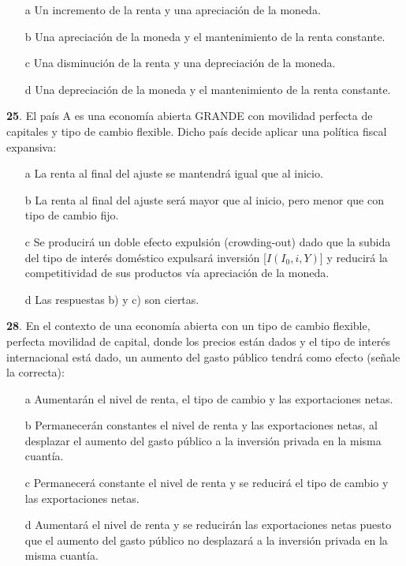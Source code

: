 \documentclass{nuevotema}
\begin{document}
\begin{enumerate}
	\item[a] Un incremento de la renta y una apreciación de la moneda.
	\item[b] Una apreciación de la moneda y el mantenimiento de la renta constante.
	\item[c] Una disminución de la renta y una depreciación de la moneda.
	\item[d] Una depreciación de la moneda y el mantenimiento de la renta constante.
\end{enumerate}

\textbf{25}. El país A es una economía abierta GRANDE con movilidad perfecta de capitales y tipo de cambio flexible. Dicho país decide aplicar una política fiscal expansiva:
\begin{enumerate}
	\item[a] La renta al final del ajuste se mantendrá igual que al inicio.
	\item[b] La renta al final del ajuste será mayor que al inicio, pero menor que con tipo de cambio fijo.
	\item[c] Se producirá un doble efecto expulsión (crowding-out) dado que la subida del tipo de interés doméstico expulsará inversión [$I(I_0, i, Y)$] y reducirá la competitividad de sus productos vía apreciación de la moneda.
	\item[d] Las respuestas b) y c) son ciertas.
\end{enumerate}


\textbf{28}. En el contexto de una economía abierta con un tipo de cambio flexible, perfecta movilidad de capital, donde los precios están dados y el tipo de interés internacional está dado, un aumento del gasto público tendrá como efecto (señale la correcta):
\begin{enumerate}
	\item[a] Aumentarán el nivel de renta, el tipo de cambio y las exportaciones netas.
	\item[b] Permanecerán constantes el nivel de renta y las exportaciones netas, al desplazar el aumento del gasto público a la inversión privada en la misma cuantía.
	\item[c] Permanecerá constante el nivel de renta y se reducirá el tipo de cambio y las exportaciones netas.
	\item[d] Aumentará el nivel de renta y se reducirán las exportaciones netas puesto que el aumento del gasto público no desplazará a la inversión privada en la misma cuantía.
\end{enumerate}
\end{document}
